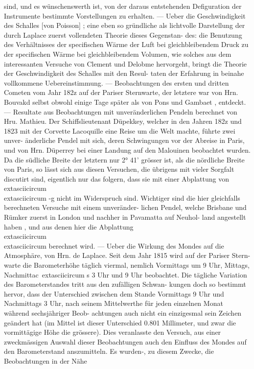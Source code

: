 \documentclass[12pt,a4paper]{article}
\begin{document}
{{{{{{{{sind,  und  es  wünschenswerth  ist,  von  der  daraus  entstehenden  Defiguration  der  Instrumente  bestimmte Vorstellungen  zu  erhalten.  ---  Ueber  die  Geschwindigkeit  des  Schalles  [von  Poisson]  ;  eine  eben so  gründliche  als  lichtvolle  Darstellung  der  durch  Laplace  zuerst  vollendeten  Theorie  dieses  Gegenstan- des: die  Benutzung  des  Verhältnisses  der  specifischen  Wärme  der  Luft  bei  gleichbleibendem  Druck  zu der  specifischen  Wärme  bei  gleichbleibendem  Volumen,  wie  solches  aus  dem  interessanten  Versuche  von Clement  und  Delobme  hervorgeht,  bringt  die  Theorie  der  Geschwindigkeit  des  Schalles  mit  den  Resul- taten der  Erfahrung  in  beinahe  vollkommene  Uebereinstimmung.  ---  Beobachtungen  des  ersten  und dritten  Cometen  vom  Jahr  182z  auf  der  Pariser  Sternwarte,  der  letztere  war  von  Hrn.  Bouvakd  selbst obwohl  einige  Tage  später  als  von  Pons  und  Gambaet  ,  entdeckt.  ---  Resultate  aus  Beobachtungen  mit unveränderlichen  Pendeln  berechnet  von  Hru.  Mathieu.  Der  Schiffslieutenant  Düpekkey,  welcher  in  den Jahren  182z  und  1823  mit  der  Corvette  Lacoquille  eine  Reise  um  die  Welt  machte,  führte  zwei  unver- änderliche Pendel  mit  sich,  deren  Schwingungen  vor  der  Abreise  in  Paris,  und  von  Hrn.  Düperrey  bei einer  Landung  auf  den  Malouinen  beobachtet  wurden.  Da  die  südliche  Breite  der  letztern  nur  2°  41' grösser  ist,  als  die  nördliche  Breite  von  Paris,  so  lässt  sich  aus  diesen  Versuchen,  die  übrigens  mit vieler  Sorgfalt  discutirt  sind,  eigentlich  nur  das  folgern,  dass  sie  mit  einer  Abplattung  von  \\	extasciicircum{}{ }{ }\\	extasciicircum{}{ }{ }-g  nicht im  Widerspruch  sind.  Wichtiger  sind  die  hier  gleichfalls  berechneten  Versuche  mit  einem  unveränder- lichen Pendel,  welche  Brisbane  und  Rümker  zuerst  in  London  und  nachher  in  Pavamatta  auf  Neuhol- land angestellt  haben ,  und  aus  denen  hier  die  Abplattung  \\	extasciicircum{}{ }{ }\\	extasciicircum{}{ }{ }  berechnet  wird.  ---  Ueber  die  Wirkung des  Mondes  auf  die  Atmosphäre,  von  Hrn.  de  Laplace.  Seit  dem  Jahr  1815  wird  auf  der  Pariser  Stern- warte die  Barometerhöhe  täglich  viermal,  nemlich  Vormittags  um  9  Uhr,  Mittags,  Nachmittac\	extasciicircum{}{ }s  3  Uhr und  9  Uhr  beobachtet.  Die  tägliche  Variation  des  Barometerstandes  tritt  aus  den  zufälligen  Schwan- kungen doch  so  bestimmt  hervor,  dass  der  Unterschied  zwischen  dem  Stande  Vormittags  9  Uhr  und Nachmittags  3  Uhr,  nach  seinem  Mittelwerthe  für  jeden  einzelnen  Monat  während  sechsjähriger  Beob- achtungen auch  nicht  ein  einzigesmal  sein  Zeichen  geändert  hat  (im  Mittel  ist  dieser  Unterschied  0.801 Millimeter,  und  zwar  die  vormittägige  Höhe  die  grössere).  Dies  veranlasste  den  Versuch,  aus  einer zweckmässigen  Auswahl  dieser  Beobachtungen  auch  den  Einfluss  des  Mondes  auf  den  Barometerstand anszumitteln.  Es  wurden-,  zu  diesem  Zwecke,  die  Beobachtungen  in  der  Nähe  }}}}}}}}
\end{document}
